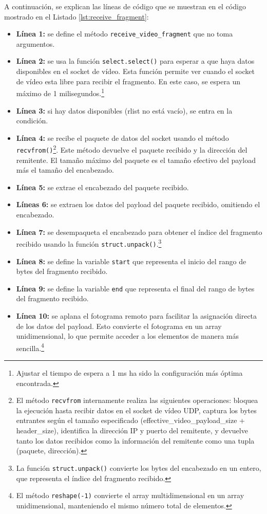 A continuación, se explican las líneas de código que se muestran en el código mostrado en el Listado \ref{lst:receive_fragment}:
\begin{itemize}
    \item \textbf{Línea 1:} se define el método \texttt{receive\_video\_fragment} que no toma argumentos.
    \item \textbf{Línea 2:} se usa la función \texttt{select.select()} para esperar a que haya datos disponibles en el socket de vídeo. Esta función permite ver cuando el socket de vídeo esta libre para recibir el fragmento. En este caso, se espera un máximo de 1 milisegundos.\footnote{Ajustar el tiempo de espera a 1 ms ha sido la configuración más óptima encontrada.}
    \item \textbf{Línea 3:} si hay datos disponibles (rlist no está vacío), se entra en la condición.
    \item \textbf{Línea 4:} se recibe el paquete de datos del socket usando el método \texttt{recvfrom()}\footnote{El método \texttt{recvfrom} internamente realiza las siguientes operaciones: bloquea la ejecución hasta recibir datos en el socket de vídeo UDP, captura los bytes entrantes según el tamaño especificado (effective\_video\_payload\_size + header\_size), identifica la dirección IP y puerto del remitente, y devuelve tanto los datos recibidos como la información del remitente como una tupla (paquete, dirección).}. Este método devuelve el paquete recibido y la dirección del remitente. El tamaño máximo del paquete es el tamaño efectivo del payload más el tamaño del encabezado.
    \item \textbf{Línea 5:} se extrae el encabezado del paquete recibido.
    \item \textbf{Líneas 6:} se extraen los datos del payload del paquete recibido, omitiendo el encabezado.
    \item \textbf{Línea 7:} se desempaqueta el encabezado para obtener el índice del fragmento recibido usando la función \texttt{struct.unpack()}.\footnote{La función \texttt{struct.unpack()} convierte los bytes del encabezado en un entero, que representa el índice del fragmento recibido.}
    \item \textbf{Línea 8:} se define la variable \texttt{start} que representa el inicio del rango de bytes del fragmento recibido.
    \item \textbf{Línea 9:} se define la variable \texttt{end} que representa el final del rango de bytes del fragmento recibido.
    \item \textbf{Línea 10:} se aplana el fotograma remoto para facilitar la asignación directa de los datos del payload. Esto convierte el fotograma en un array unidimensional, lo que permite acceder a los elementos de manera más sencilla.\footnote{El método \texttt{reshape(-1)} convierte el array multidimensional en un array unidimensional, manteniendo el mismo número total de elementos.}

\end{itemize}
